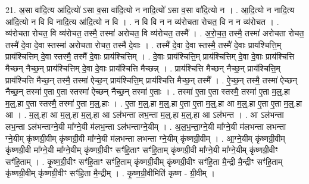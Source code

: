 \documentclass[17pt]{extarticle}
\begin{document}
21. अ॒सा वा॑दि॒त्य आ॑दि॒त्यो॑ ऽसा व॒सा वा॑दि॒त्यो न नादि॒त्यो॑ ऽसा व॒सा वा॑दि॒त्यो न । . आ॒दि॒त्यो न नादि॒त्य आ॑दि॒त्यो न वि वि नादि॒त्य आ॑दि॒त्यो न वि । . न वि वि न न व्य॑रोचता रोचत॒ वि न न व्य॑रोचत । . व्य॑रोचता रोचत॒ वि व्य॑रोचत॒ तस्मै॒ तस्मा॑ अरोचत॒ वि व्य॑रोचत॒ तस्मै᳚ । . अ॒रो॒च॒त॒ तस्मै॒ तस्मा॑ अरोचता रोचत॒ तस्मै॑ दे॒वा दे॒वा स्तस्मा॑ अरोचता रोचत॒ तस्मै॑ दे॒वाः । . तस्मै॑ दे॒वा दे॒वा स्तस्मै॒ तस्मै॑ दे॒वाः प्राय॑श्चित्ति॒म् प्राय॑श्चित्तिम् दे॒वा स्तस्मै॒ तस्मै॑ दे॒वाः प्राय॑श्चित्तिम् । . दे॒वाः प्राय॑श्चित्ति॒म् प्राय॑श्चित्तिम् दे॒वा दे॒वाः प्राय॑श्चित्ति मैच्छन् नैच्छ॒न् प्राय॑श्चित्तिम् दे॒वा दे॒वाः प्राय॑श्चित्ति मैच्छन्न् । . प्राय॑श्चित्ति मैच्छन् नैच्छ॒न् प्राय॑श्चित्ति॒म् प्राय॑श्चित्ति मैच्छ॒न् तस्मै॒ तस्मा॑ ऐच्छ॒न् प्राय॑श्चित्ति॒म् प्राय॑श्चित्ति मैच्छ॒न् तस्मै᳚ । . ऐ॒च्छ॒न् तस्मै॒ तस्मा॑ ऐच्छन् नैच्छ॒न् तस्मा॑ ए॒ता ए॒ता स्तस्मा॑ ऐच्छन् नैच्छ॒न् तस्मा॑ ए॒ताः । . तस्मा॑ ए॒ता ए॒ता स्तस्मै॒ तस्मा॑ ए॒ता म॒ल्॒.हा म॒ल्॒.हा ए॒ता स्तस्मै॒ तस्मा॑ ए॒ता म॒ल्॒.हाः । . ए॒ता म॒ल्॒.हा म॒ल्॒.हा ए॒ता ए॒ता म॒ल्॒.हा आ म॒ल्॒.हा ए॒ता ए॒ता म॒ल्॒.हा आ । . म॒ल्॒.हा आ म॒ल्॒.हा म॒ल्॒.हा आ ऽल॑भन्ता लभ॒न्ता म॒ल्॒.हा म॒ल्॒.हा आ ऽल॑भन्त । . आ ऽल॑भन्ता लभ॒न्ता ऽल॑भन्ताग्ने॒यी मा᳚ग्ने॒यी म॑लभ॒न्ता ऽल॑भन्ताग्ने॒यीम् । . अ॒ल॒भ॒न्ता॒ग्ने॒यी मा᳚ग्ने॒यी म॑लभन्ता लभन्ता ग्ने॒यीम् कृ॑ष्णग्री॒वीम् कृ॑ष्णग्री॒वी मा᳚ग्ने॒यी म॑लभन्ता लभन्ता ग्ने॒यीम् कृ॑ष्णग्री॒वीम् । . आ॒ग्ने॒यीम् कृ॑ष्णग्री॒वीम् कृ॑ष्णग्री॒वी मा᳚ग्ने॒यी मा᳚ग्ने॒यीम् कृ॑ष्णग्री॒वीꣳ सꣳ॑हि॒ताꣳ सꣳ॑हि॒ताम् कृ॑ष्णग्री॒वी मा᳚ग्ने॒यी मा᳚ग्ने॒यीम् कृ॑ष्णग्री॒वीꣳ सꣳ॑हि॒ताम् । . कृ॒ष्ण॒ग्री॒वीꣳ सꣳ॑हि॒ताꣳ सꣳ॑हि॒ताम् कृ॑ष्णग्री॒वीम् कृ॑ष्णग्री॒वीꣳ सꣳ॑हि॒ता मै॒न्द्री मै॒न्द्रीꣳ सꣳ॑हि॒ताम् कृ॑ष्णग्री॒वीम् कृ॑ष्णग्री॒वीꣳ सꣳ॑हि॒ता मै॒न्द्रीम् । . कृ॒ष्ण॒ग्री॒वीमिति॑ कृष्ण - ग्री॒वीम् । \newline
\end{document}
